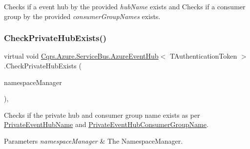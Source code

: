 Checks if a event hub by the provided {\itshape hub\+Name}  exists and Checks if a consumer group by the provided {\itshape consumer\+Group\+Names}  exists. 

\mbox{\label{classCqrs_1_1Azure_1_1ServiceBus_1_1AzureEventHub_a5eea5010c95290cb4081679538a06555_a5eea5010c95290cb4081679538a06555}} 
\subsubsection{\texorpdfstring{Check\+Private\+Hub\+Exists()}{CheckPrivateHubExists()}}
{\footnotesize\ttfamily virtual void \hyperlink{classCqrs_1_1Azure_1_1ServiceBus_1_1AzureEventHub}{Cqrs.\+Azure.\+Service\+Bus.\+Azure\+Event\+Hub}$<$ T\+Authentication\+Token $>$.Check\+Private\+Hub\+Exists (\begin{DoxyParamCaption}\item[{Namespace\+Manager}]{namespace\+Manager }\end{DoxyParamCaption})\hspace{0.3cm}{\ttfamily [protected]}, {\ttfamily [virtual]}}



Checks if the private hub and consumer group name exists as per \hyperlink{classCqrs_1_1Azure_1_1ServiceBus_1_1AzureEventHub_ac6802047e00a92ea4b0ae6b69ef7310a_ac6802047e00a92ea4b0ae6b69ef7310a}{Private\+Event\+Hub\+Name} and \hyperlink{classCqrs_1_1Azure_1_1ServiceBus_1_1AzureEventHub_a0c091d0cb19dda3e8bfc20f0e7d30af3_a0c091d0cb19dda3e8bfc20f0e7d30af3}{Private\+Event\+Hub\+Consumer\+Group\+Name}. 


\begin{DoxyParams}{Parameters}
{\em namespace\+Manager} & The Namespace\+Manager.\\
\hline
\end{DoxyParams}
\mbox{\label{classCqrs_1_1Azure_1_1ServiceBus_1_1AzureEventHub_ae60a7cddcb566ff8f5cf2ac2db17733e_ae60a7cddcb566ff8f5cf2ac2db17733e}} 
